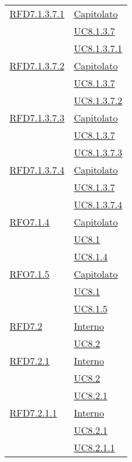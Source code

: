 \begin{longtable}{|>{\centering}m{5cm}|m{5cm}<{\centering}|}
\hyperlink{RFD7.1.3.7.1}{RFD7.1.3.7.1} & \hyperlink{Capitolato}{Capitolato}\\
& \hyperref[UC8.1.3.7]{UC8.1.3.7}\\
& \hyperref[UC8.1.3.7.1]{UC8.1.3.7.1}\\ \hline

\hyperlink{RFD7.1.3.7.2}{RFD7.1.3.7.2} & \hyperlink{Capitolato}{Capitolato}\\
& \hyperref[UC8.1.3.7]{UC8.1.3.7}\\
& \hyperref[UC8.1.3.7.2]{UC8.1.3.7.2}\\ \hline

\hyperlink{RFD7.1.3.7.3}{RFD7.1.3.7.3} & \hyperlink{Capitolato}{Capitolato}\\
& \hyperref[UC8.1.3.7]{UC8.1.3.7}\\
& \hyperref[UC8.1.3.7.3]{UC8.1.3.7.3}\\ \hline

\hyperlink{RFD7.1.3.7.4}{RFD7.1.3.7.4} & \hyperlink{Capitolato}{Capitolato}\\
& \hyperref[UC8.1.3.7]{UC8.1.3.7}\\
& \hyperref[UC8.1.3.7.4]{UC8.1.3.7.4}\\ \hline

\hyperlink{RFO7.1.4}{RFO7.1.4} & \hyperlink{Capitolato}{Capitolato}\\
& \hyperref[UC8.1]{UC8.1}\\
& \hyperref[UC8.1.4]{UC8.1.4}\\ \hline

\hyperlink{RFO7.1.5}{RFO7.1.5} & \hyperlink{Capitolato}{Capitolato}\\
& \hyperref[UC8.1]{UC8.1}\\
& \hyperref[UC8.1.5]{UC8.1.5}\\ \hline

\hyperlink{RFD7.2}{RFD7.2} & \hyperlink{Interno}{Interno}\\
& \hyperref[UC8.2]{UC8.2}\\ \hline

\hyperlink{RFD7.2.1}{RFD7.2.1} & \hyperlink{Interno}{Interno}\\
& \hyperref[UC8.2]{UC8.2}\\
& \hyperref[UC8.2.1]{UC8.2.1}\\ \hline

\hyperlink{RFD7.2.1.1}{RFD7.2.1.1} & \hyperlink{Interno}{Interno}\\
& \hyperref[UC8.2.1]{UC8.2.1}\\
& \hyperref[UC8.2.1.1]{UC8.2.1.1}\\ \hline


\end{longtable}

